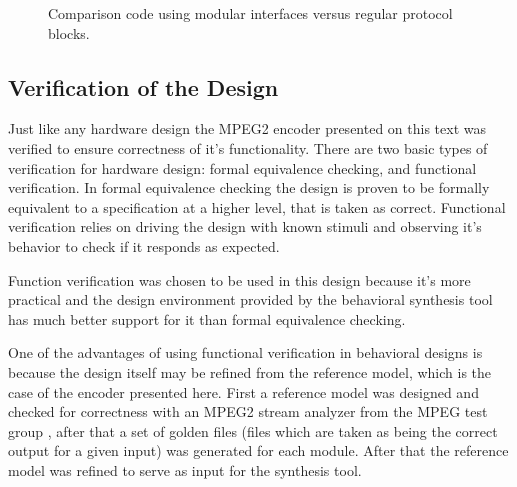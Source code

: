\documentclass[a4paper, 12pt]{article}
\begin{document}
\begin{singlespace}
\begin{figure}[h!]
%
\caption{Comparison code using modular interfaces versus regular protocol blocks.}
\label{fig:protocolcode}
\end{figure}
\end{singlespace}

\subsection{Verification of the Design}

Just like any hardware design the MPEG2 encoder presented on this text was verified to ensure correctness of it's functionality. There are two basic types of verification for hardware design: formal equivalence checking, and functional verification. In formal equivalence checking the design is proven to be formally equivalent to a specification at a higher level, that is taken as correct. Functional verification relies on driving the design with known stimuli and observing it's behavior to check if it responds as expected.

Function verification was chosen to be used in this design because it's more practical and the design environment provided by the behavioral synthesis tool has much better support for it than formal equivalence checking.

One of the advantages of using functional verification in behavioral designs is because the design itself may be refined from the reference model, which is the case of the encoder presented here. First a reference model was designed and checked for correctness with an MPEG2 stream analyzer from the MPEG test group \cite{mpeg2dec}, after that a set of golden files (files which are taken as being the correct output for a given input) was generated for each module. After that the reference model was refined to serve as input for the synthesis tool.
\end{document}
